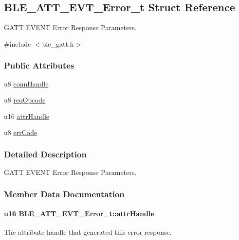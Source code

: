 \hypertarget{struct_b_l_e___a_t_t___e_v_t___error__t}{}\subsection{B\+L\+E\+\_\+\+A\+T\+T\+\_\+\+E\+V\+T\+\_\+\+Error\+\_\+t Struct Reference}
\label{struct_b_l_e___a_t_t___e_v_t___error__t}


G\+A\+TT E\+V\+E\+NT Error Response Parameters.  




{\ttfamily \#include $<$ble\+\_\+gatt.\+h$>$}

\subsubsection*{Public Attributes}
\begin{DoxyCompactItemize}
\item 
u8 \hyperlink{struct_b_l_e___a_t_t___e_v_t___error__t_a831c30fbcd86b298ea4c0cc4225558a7}{conn\+Handle}
\item 
u8 \hyperlink{struct_b_l_e___a_t_t___e_v_t___error__t_adb4538600002ad67fedf1dd814783866}{req\+Opcode}
\item 
u16 \hyperlink{struct_b_l_e___a_t_t___e_v_t___error__t_a9094bc5c0330fa53b39b997970af3194}{attr\+Handle}
\item 
u8 \hyperlink{struct_b_l_e___a_t_t___e_v_t___error__t_a0da6b9b9363d925bc8b703c9fdd1cdfe}{err\+Code}
\end{DoxyCompactItemize}


\subsubsection{Detailed Description}
G\+A\+TT E\+V\+E\+NT Error Response Parameters. 

\subsubsection{Member Data Documentation}
\paragraph[{\texorpdfstring{attr\+Handle}{attrHandle}}]{\setlength{\rightskip}{0pt plus 5cm}u16 B\+L\+E\+\_\+\+A\+T\+T\+\_\+\+E\+V\+T\+\_\+\+Error\+\_\+t\+::attr\+Handle}\hypertarget{struct_b_l_e___a_t_t___e_v_t___error__t_a9094bc5c0330fa53b39b997970af3194}{}\label{struct_b_l_e___a_t_t___e_v_t___error__t_a9094bc5c0330fa53b39b997970af3194}
The attribute handle that generated this error response. 
